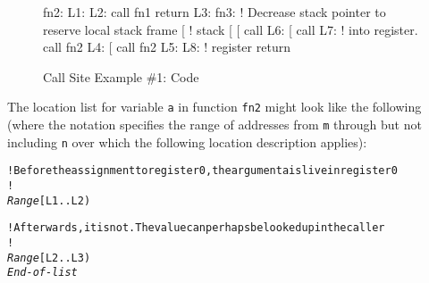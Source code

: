 \begin{figure}[ht]
\begin{nlnlisting}
fn2:
L1:
L2:
    call fn1
    return
L3:
fn3:
    ! Decrease stack pointer to reserve local stack frame
    [%
                          !   stack
    [%
    [%
    call %
L6:
    [%
    call %
L7:
                          !   into register.
    call fn2
L4:
    [%
    call fn2
L5:
L8:
                          !   register
    return
\end{nlnlisting}
\caption{Call Site Example \#1: Code}
\label{fig:callsiteexample1code}
\end{figure}

\clearpage
The location list for variable \texttt{a} in function \texttt{fn2}
might look like the following 
(where the notation \doublequote{\textit{Range} [\texttt{m .. n)}} 
specifies the range of addresses from \texttt{m} through but not 
including \texttt{n} over which the following
location description applies):

\nolinenumbers
\begin{dwflisting}
\begin{alltt}

    ! Before the assignment to register 0, the argument a is live in register 0
    !
    \textit{Range} [L1 .. L2) 
        \DWOPregzero

    ! Afterwards, it is not. The value can perhaps be looked up in the caller
    !
    \textit{Range} [L2 .. L3) 
         \DWOPregzero \DWOPstackvalue
    \textit{End-of-list}

\end{alltt}
\end{dwflisting}

